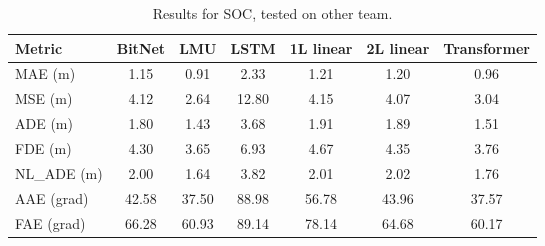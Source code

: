\begin{table}[H]
\centering
\caption{Results for SOC, tested on other team.}
\label{other_team:SOC}
\begin{tabular}{l||c|c|c|c|c|c}

Metric & BitNet & LMU & LSTM & 1L linear & 2L linear & Transformer \\
\hline\hline
MAE (m) & 1.15 & 0.91 & 2.33 & 1.21 & 1.20 & 0.96 \\
MSE (m) & 4.12 & 2.64 & 12.80 & 4.15 & 4.07 & 3.04 \\
ADE (m) & 1.80 & 1.43 & 3.68 & 1.91 & 1.89 & 1.51 \\
FDE (m) & 4.30 & 3.65 & 6.93 & 4.67 & 4.35 & 3.76 \\
NL\_ADE (m) & 2.00 & 1.64 & 3.82 & 2.01 & 2.02 & 1.76 \\
AAE (grad) & 42.58 & 37.50 & 88.98 & 56.78 & 43.96 & 37.57 \\
FAE (grad) & 66.28 & 60.93 & 89.14 & 78.14 & 64.68 & 60.17 \\
\end{tabular}
\end{table}
